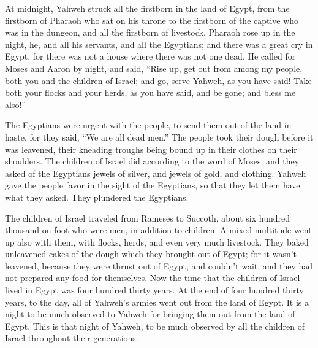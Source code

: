  At midnight, Yahweh struck all the firstborn in the land
of Egypt, from the firstborn of Pharaoh who sat on his throne to the
firstborn of the captive who was in the dungeon, and all the firstborn
of livestock.  Pharaoh rose up in the night, he, and all
his servants, and all the Egyptians; and there was a great cry in Egypt,
for there was not a house where there was not one dead. 
He called for Moses and Aaron by night, and said, ``Rise up, get out
from among my people, both you and the children of Israel; and go, serve
Yahweh, as you have said!  Take both your flocks and your
herds, as you have said, and be gone; and bless me also!''

 The Egyptians were urgent with the people, to send them
out of the land in haste, for they said, ``We are all dead men.''
 The people took their dough before it was leavened,
their kneading troughs being bound up in their clothes on their
shoulders.  The children of Israel did according to the
word of Moses; and they asked of the Egyptians jewels of silver, and
jewels of gold, and clothing.  Yahweh gave the people
favor in the sight of the Egyptians, so that they let them have what
they asked. They plundered the Egyptians.

 The children of Israel traveled from Rameses to Succoth,
about six hundred thousand on foot who were men, in addition to
children.  A mixed multitude went up also with them, with
flocks, herds, and even very much livestock.  They baked
unleavened cakes of the dough which they brought out of Egypt; for it
wasn't leavened, because they were thrust out of Egypt, and couldn't
wait, and they had not prepared any food for themselves. 
Now the time that the children of Israel lived in Egypt was four hundred
thirty years.  At the end of four hundred thirty years,
to the day, all of Yahweh's armies went out from the land of Egypt.
 It is a night to be much observed to Yahweh for bringing
them out from the land of Egypt. This is that night of Yahweh, to be
much observed by all the children of Israel throughout their
generations.

